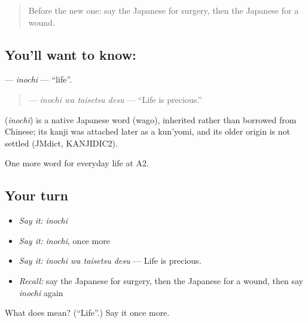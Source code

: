 \begin{quote}
Before the new one: say the Japanese for surgery, then the Japanese for a wound.
\end{quote}

\subsection*{You'll want to know: }
\textbf{} — \emph{inochi} — \textquotedblleft{}life\textquotedblright{}.

\begin{quote}
\textbf{ } — \emph{inochi wa taisetsu desu} — \textquotedblleft{}Life is precious.\textquotedblright{}
\end{quote}

\begin{cousinweb}
\textbf{} (\emph{inochi}) is a native Japanese word (wago), inherited rather than borrowed from Chinese; its kanji was attached later as a kun'yomi, and its older origin is not settled (JMdict, KANJIDIC2).
\end{cousinweb}

\begin{grammarlens}[title={What you've built}]
One more word for everyday life at A2.
\end{grammarlens}

\subsection*{Your turn}
\begin{itemize}
\raggedright
  \item \emph{Say it:} \emph{inochi}
  \item \emph{Say it:} \emph{inochi}, once more
  \item \emph{Say it:} \emph{inochi wa taisetsu desu} — Life is precious.
  \item \emph{Recall:} say the Japanese for surgery, then the Japanese for a wound, then say \emph{inochi} again
\end{itemize}

\begin{tcolorbox}[breakable,colback=teal!4,colframe=teal!35!black,title={Before you move on}]
What does  mean? (\textquotedblleft{}Life\textquotedblright{}.) Say it once more.
\end{tcolorbox}
